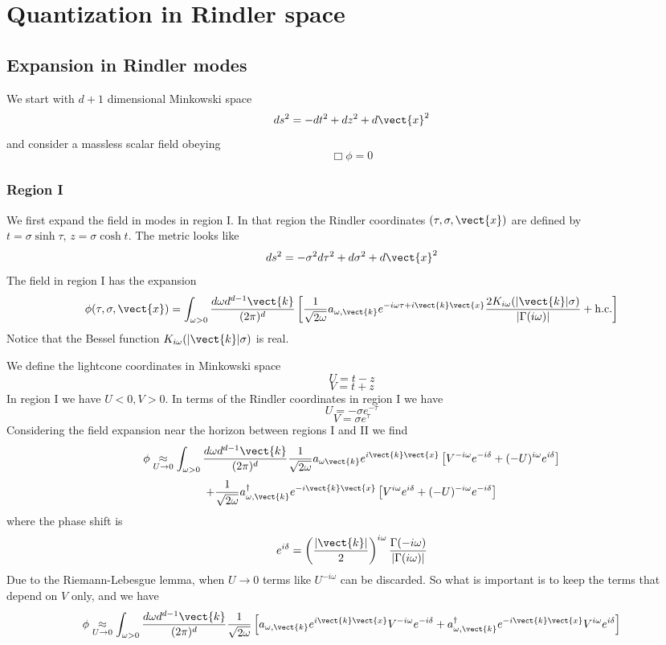 \section{Quantization in Rindler space \label{rindlerq}}

  
\subsection{Expansion in Rindler modes}
We start with $d+1$ dimensional Minkowski space
\[
ds^2 = -dt^2 + dz^2 + d\vect{x}^2
\]
and consider a massless scalar field obeying
\[
 \Box \phi = 0
\]

\subsubsection{Region I}

We first expand the field in modes in region I. In that region the Rindler coordinates $(\tau,\sigma,\vect{x})$ are defined by $t= \sigma \sinh \tau,\, z = \sigma \cosh t$. The metric looks like
\[
ds^2 = -\sigma^2 d\tau^2 + d\sigma^2 + d\vect{x}^2
\]
The field in region I has the expansion
\[
\phi(\tau,\sigma,\vect{x}) = \int_{\omega>0}{d\omega d^{d-1}\vect{k} \over (2 \pi)^d} \left[{1\over \sqrt{2\omega}} a_{\omega,\vect{k}} e^{-i\omega \tau+i \vect{k} \vect{x}}{2 K_{i\omega}(|\vect{k}| \sigma)
\over |\Gamma(i\omega)|} + {\rm h.c.}
\right]
\]
Notice that the Bessel function $K_{i\omega}(|\vect{k}| \sigma)$ is real. 

We define the lightcone coordinates in Minkowski space
\[
U = t-z
\]
\[
V= t+z
\]
In region I we have $U<0,V>0$. In terms of the Rindler coordinates in region I we have
\[
U = - \sigma e^{-\tau}\]
\[
V = \sigma e^{\tau}
\]
Considering the field expansion near the horizon between regions I and II we find
\[
\phi  \underset{U \rightarrow 0}{\approx} \int_{\omega>0}{d\omega d^{d-1}\vect{k} \over (2 \pi)^d}{1\over \sqrt{2\omega}} a_{\omega\vect{k}} e^{i \vect{k} \vect{x}} \left[V^{-i\omega} e^{-i\delta} + (-U)^{i\omega}e^{i\delta}\right]
\]
\[
+ {1\over \sqrt{2\omega}} a_{\omega,\vect{k}}^\dagger e^{-i \vect{k} \vect{x}} \left[V^{i\omega} e^{i\delta} + (-U)^{-i\omega}e^{-i\delta}\right]
\]
where the phase shift is
\begin{equation}
\label{phase}
e^{i\delta} = \left({|\vect{k}|\over 2}\right)^{i\omega} {\Gamma(-i\omega) \over |\Gamma(i\omega)|}
\end{equation}
Due to the Riemann-Lebesgue lemma, when $U\rightarrow 0$ terms like $U^{-i \omega}$ can be discarded. So what is important is to keep the terms that depend on $V$ only, and we have
\begin{equation}
\label{boundaryIandII}
\phi  \underset{U \rightarrow 0}{\approx}\int_{\omega>0}{d\omega d^{d-1}\vect{k} \over (2 \pi)^d} {1\over \sqrt{2\omega}} \left[a_{\omega,\vect{k}} e^{i \vect{k} \vect{x}} V^{-i\omega} e^{-i\delta} + 
 a_{\omega,\vect{k}}^\dagger e^{-i \vect{k} \vect{x}} V^{i\omega} e^{i\delta} \right]
\end{equation}

